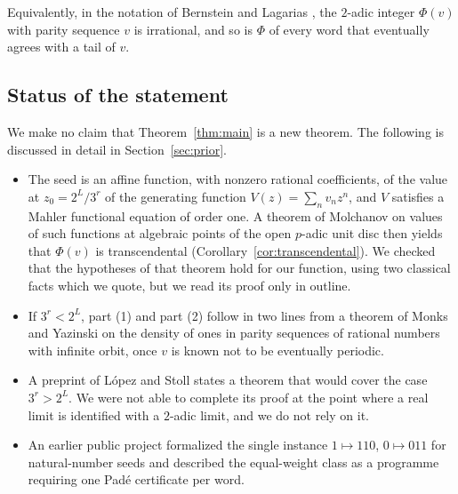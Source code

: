 \documentclass[11pt,reqno]{amsart}
\theoremstyle{definition}
\theoremstyle{remark}
\begin{document}
Equivalently, in the notation of Bernstein and Lagarias
\cite{BernsteinLagarias1996}, the $2$-adic integer $\Phi(v)$ with parity
sequence $v$ is irrational, and so is $\Phi$ of every word that eventually
agrees with a tail of $v$.

\subsection{Status of the statement}
We make no claim that Theorem~\ref{thm:main} is a new theorem.  The
following is discussed in detail in Section~\ref{sec:prior}.
\begin{itemize}
\item The seed is an affine function, with nonzero rational coefficients, of
the value at $z_0=2^{L}/3^{r}$ of the generating function
$V(z)=\sum_n v_nz^n$, and $V$ satisfies a Mahler functional equation of
order one.  A theorem of Molchanov \cite{Molchanov1983} on values of such
functions at algebraic points of the open $p$-adic unit disc then yields
that $\Phi(v)$ is transcendental
(Corollary~\ref{cor:transcendental}).  We checked that the hypotheses of
that theorem hold for our function, using two classical facts which we
quote, but we read its proof only in outline.
\item If $3^{r}<2^{L}$, part (1) and part (2) follow in two lines from a
theorem of Monks and Yazinski \cite{MonksYazinski2004} on the density of
ones in parity sequences of rational numbers with infinite orbit, once $v$
is known not to be eventually periodic.
\item A preprint of L\'opez and Stoll \cite{LopezStoll2021} states a
theorem that would cover the case $3^{r}>2^{L}$.  We were not able to
complete its proof at the point where a real limit is identified with a
$2$-adic limit, and we do not rely on it.
\item An earlier public project \cite{Upstream} formalized the single
instance $1\mapsto 110$, $0\mapsto 011$ for natural-number seeds and
described the equal-weight class as a programme requiring one Pad\'e
certificate per word.
\end{itemize}
\end{document}
